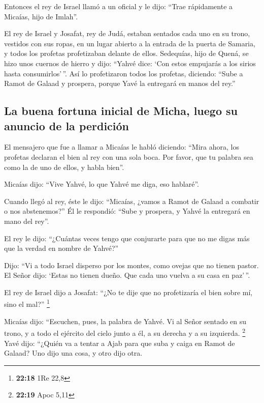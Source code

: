 \begin{paracol}{2}
 Entonces el rey de Israel llamó a un oficial y le dijo:
``Trae rápidamente a Micaías, hijo de Imlah''.

 El rey de Israel y Josafat, rey de Judá, estaban
sentados cada uno en su trono, vestidos con sus ropas, en un lugar
abierto a la entrada de la puerta de Samaria, y todos los profetas
profetizaban delante de ellos.  Sedequías, hijo de Quená,
se hizo unos cuernos de hierro y dijo: ``Yahvé dice: `Con estos
empujarás a los sirios hasta consumirlos'\,''.  Así lo
profetizaron todos los profetas, diciendo: ``Sube a Ramot de Galaad y
prospera, porque Yavé la entregará en manos del rey.''

\hypertarget{la-buena-fortuna-inicial-de-micha-luego-su-anuncio-de-la-perdiciuxf3n}{%
\subsection{La buena fortuna inicial de Micha, luego su anuncio de la
perdición}\label{la-buena-fortuna-inicial-de-micha-luego-su-anuncio-de-la-perdiciuxf3n}}

 El mensajero que fue a llamar a Micaías le habló
diciendo: ``Mira ahora, los profetas declaran el bien al rey con una
sola boca. Por favor, que tu palabra sea como la de uno de ellos, y
habla bien''.

 Micaías dijo: ``Vive Yahvé, lo que Yahvé me diga, eso
hablaré''.

 Cuando llegó al rey, éste le dijo: ``Micaías, ¿vamos a
Ramot de Galaad a combatir o nos abstenemos?'' Él le respondió: ``Sube y
prospera, y Yahvé la entregará en mano del rey''.

 El rey le dijo: ``¿Cuántas veces tengo que conjurarte
para que no me digas más que la verdad en nombre de Yahvé?''

 Dijo: ``Vi a todo Israel disperso por los montes, como
ovejas que no tienen pastor. El Señor dijo: `Estas no tienen dueño. Que
cada uno vuelva a su casa en paz'\,''.

 El rey de Israel dijo a Josafat: ``¿No te dije que no
profetizaría el bien sobre mí, sino el mal?'' \footnote{\textbf{22:18}
  1Re 22,8}

 Micaías dijo: ``Escuchen, pues, la palabra de Yahvé. Vi
al Señor sentado en su trono, y a todo el ejército del cielo junto a él,
a su derecha y a su izquierda. \footnote{\textbf{22:19} Apoc 5,11}
 Yavé dijo: ``¿Quién va a tentar a Ajab para que suba y
caiga en Ramot de Galaad? Uno dijo una cosa, y otro dijo otra.


\end{paracol}
